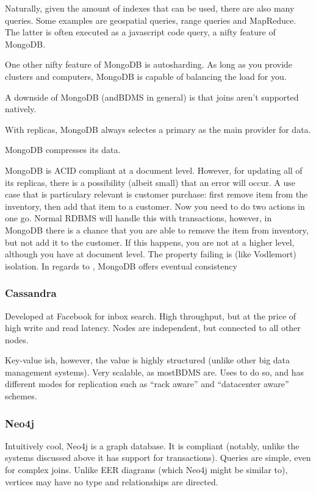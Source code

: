 Naturally, given the amount of indexes that can be used, there are also many queries.
Some examples are geospatial queries, range queries and MapReduce. The latter is often
executed as a javascript code query, a nifty feature of MongoDB.

One other nifty feature of MongoDB is autosharding. As long as you provide clusters
and computers, MongoDB is capable of balancing the load for you.

A downside of MongoDB (andBDMS in general) is that joins
aren't supported natively. 

With replicas, MongoDB always selectes a primary as the main provider for data.

MongoDB compresses its data.

MongoDB is ACID compliant at a document level. However, for updating all of its replicas, 
there is a possibility (albeit small) that an error will occur. A use case that is particulary relevant
is customer purchase: first remove item from the inventory, then add that item to a customer.
Now you need to do two actions in one go. Normal RDBMS will handle this with transactions,
however, in MongoDB there is a chance that you are able to remove the item from inventory, but not add
it to the customer. If this happens, you are not  at a higher level, although you have  at document level. The property failing is (like Vodlemort) isolation.
In regards to , MongoDB offers eventual consistency

\subsubsection{Cassandra}\label{sec:cassandra}
Developed at Facebook for inbox search.
High throughput, but at the price of high write and read latency.
Nodes are independent, but connected to all other nodes.

Key-value ish, however, the value is highly structured (unlike other big data
management systems).  Very scalable, as mostBDMS are.
Uses  to do so, and has different modes for replication
such as ``rack aware'' and ``datacenter aware'' schemes.

\subsubsection{Neo4j}\label{sec:neo4j}
Intuitively cool, Neo4j is a graph database. It is  compliant (notably, unlike the systems discussed above it has support for transactions).
Queries are simple, even for complex joins. Unlike EER diagrams (which Neo4j might be
similar to), vertices may have no type and relationships are directed.

